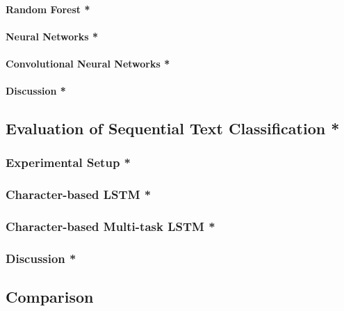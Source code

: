 \paragraph{Random Forest *}
\paragraph{Neural Networks *}
\paragraph{Convolutional Neural Networks *}

\paragraph{Discussion *}


\subsection{Evaluation of Sequential Text Classification *}


\subsubsection{Experimental Setup *}

\subsubsection{Character-based LSTM *}

\subsubsection{Character-based Multi-task LSTM *}

\subsubsection{Discussion *}

\subsection{Comparison}
